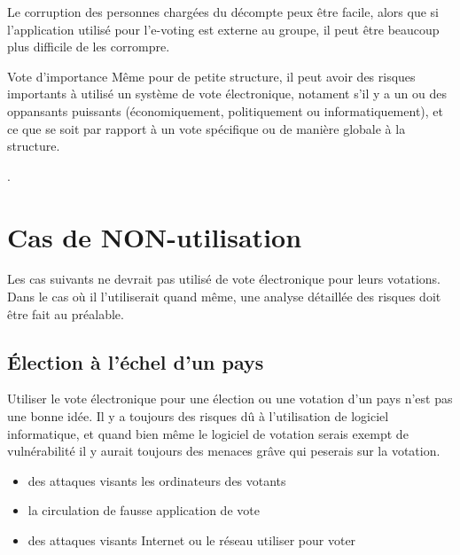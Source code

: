 \documentclass[../report]{subfiles}
\begin{document}
Le corruption des personnes chargées du décompte peux être facile, alors que si l'application utilisé pour
l'e-voting est externe au groupe, il peut être beaucoup plus difficile de les corrompre.

\begin{important}{Vote d'importance}
  Même pour de petite structure, il peut avoir des risques importants à utilisé un système de vote électronique, 
  notament s'il y a un ou des oppansants puissants (économiquement, politiquement ou informatiquement), et ce que
  se soit par rapport à un vote spécifique ou de manière globale à la structure.
\end{important}

%

.

\section{Cas de NON-utilisation}

Les cas suivants ne devrait pas utilisé de vote électronique pour leurs votations. 
Dans le cas où il l'utiliserait quand même, une analyse détaillée des risques doit être fait au préalable.

\subsection{Élection à l'échel d'un pays}\label{sec:impl:non-use:pays}
Utiliser le vote électronique pour une élection ou une votation d'un pays n'est pas une bonne idée.
Il y a toujours des risques dû à l'utilisation de logiciel informatique, et quand bien même le logiciel de 
votation serais exempt de vulnérabilité il y aurait toujours des menaces grâve qui peserais sur la votation.
\begin{itemize}
  \item des attaques visants les ordinateurs des votants
  \item la circulation de fausse application de vote
  \item des attaques visants Internet ou le réseau utiliser pour voter
\end{itemize}
\end{document}
